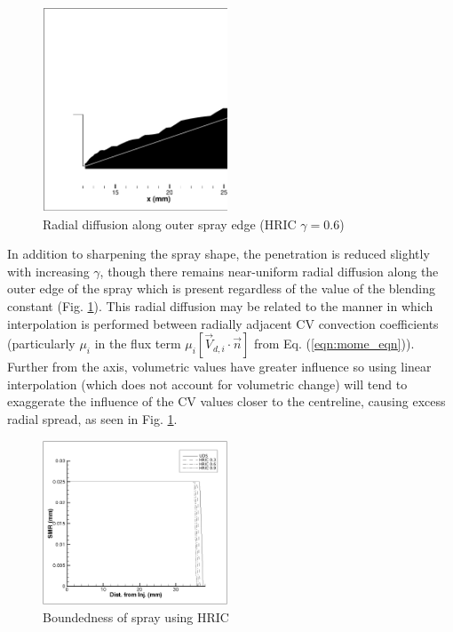 \documentclass[a4paper,10pt]{article}
\begin{document}
\begin{figure}[H]
\centering
\includegraphics[width=0.49\textwidth]{pc_103z.eps}
\caption{Radial diffusion along outer spray edge (HRIC $\gamma=0.6$)}
\label{fig:hric_103z}
\end{figure}
In addition to sharpening the spray shape, the penetration is reduced slightly with increasing $\gamma$, though there remains near-uniform radial diffusion along the outer edge of the spray which is present regardless of the value of the blending constant (Fig. \ref{fig:hric_103z}). This radial diffusion may be related to the manner in which interpolation is performed between radially adjacent CV convection coefficients (particularly $\mu_{i}$ in the flux term $\mu_{i}[\vec{V}_{d,i} \cdot \vec{n}]$ from Eq. (\ref{eqn:mome_eqn})). Further from the axis, volumetric values have greater influence so using linear interpolation (which does not account for volumetric change) will tend to exaggerate the influence of the CV values closer to the centreline, causing excess radial spread, as seen in Fig. \ref{fig:hric_103z}.
\begin{figure}[H]
\centering
\includegraphics[width=0.49\textwidth]{pc_104_cl.eps}
\caption{Boundedness of spray using HRIC}
\label{fig:hric_cl}
\end{figure}
\end{document}
